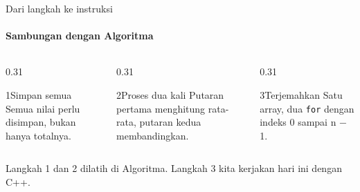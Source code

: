 \documentclass[t]{beamer}
\begin{document}
\begin{frame}{Dari langkah ke instruksi}
\framesubtitle{Sambungan dengan Algoritma}
\begin{columns}[T]
\begin{column}{0.31\textwidth}
\begin{Langkah}{1}{Simpan semua}
Semua nilai perlu disimpan, bukan hanya totalnya.
\end{Langkah}
\end{column}
\begin{column}{0.31\textwidth}
\begin{Langkah}{2}{Proses dua kali}
Putaran pertama menghitung rata-rata, putaran kedua membandingkan.
\end{Langkah}
\end{column}
\begin{column}{0.31\textwidth}
\begin{Langkah}{3}{Terjemahkan}
Satu array, dua \texttt{for} dengan indeks 0 sampai n − 1.
\end{Langkah}
\end{column}
\end{columns}
\vspace{10pt}
Langkah 1 dan 2 dilatih di Algoritma. Langkah 3 kita kerjakan hari ini dengan C++.
\end{frame}

\end{document}

